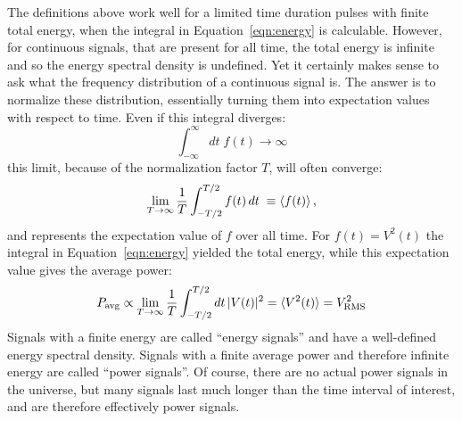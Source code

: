\documentclass[12pt,oneside]{book}
\begin{document}
The definitions above work well for a limited time duration pulses with finite total energy, when the integral in Equation~\ref{eqn:energy} is calculable.  However, for continuous signals, that are present for all time, the total energy is infinite and so the energy spectral density is undefined.  Yet it certainly makes sense to ask what the frequency distribution of a continuous signal is.  The answer is to normalize these distribution, essentially turning them into expectation values with respect to time.  Even if this integral diverges:
\begin{displaymath}
\int_{-\infty}^{\infty} dt \; f(t) \to \infty
\end{displaymath}
this limit, because of the normalization factor $T$, will often converge:
\begin{displaymath}
\lim_{T \to \infty } \frac{1}{T} \int_{-T/2}^{T/2} f(t) \, dt \; \equiv \braket{f(t)},
\end{displaymath}
and represents the expectation value of $f$ over all time.  For $f(t) = V^2(t)$ the integral in Equation~\ref{eqn:energy} yielded the total energy, while this expectation value gives the average power: 
\begin{equation}
P_{\rm avg} \propto \lim_{T\to \infty} \frac{1}{T} \int_{-T/2}^{T/2} dt \, |V(t)|^2 \label{eqn:power} = \braket{V^2(t)} = V^2_{\rm RMS}
\end{equation}
Signals with a finite energy are called ``energy signals'' and have a well-defined energy spectral density.
Signals with a finite average power and therefore infinite energy are called ``power signals''.  Of course, there are no actual power signals in the universe, but many signals last much longer than the time interval of interest, and are therefore effectively power signals.
\end{document}
